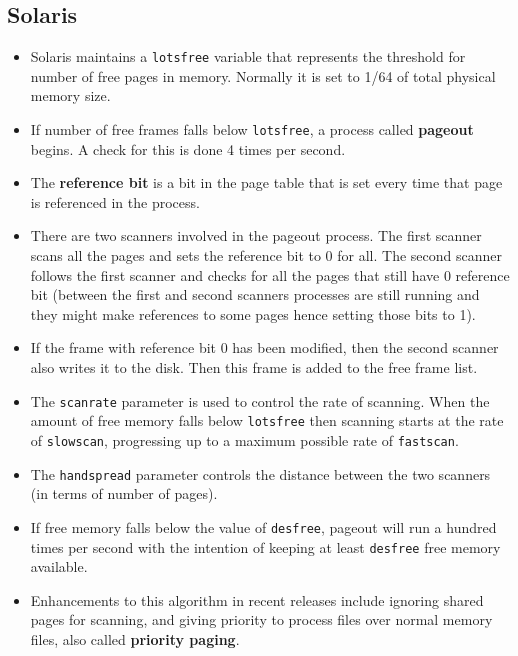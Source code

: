\documentclass{article}
\theoremstyle{plain}
\theoremstyle{definition}
\begin{document}
\subsection{Solaris}
\begin{itemize}
    \item Solaris maintains a \texttt{lotsfree} variable that represents the threshold for number of free pages in memory. Normally it is set to 1/64 of total physical memory size. 
    
    \item If number of free frames falls below \texttt{lotsfree}, a process called \textbf{pageout} begins. A check for this is done 4 times per second. 
    
    \item The \textbf{reference bit} is a bit in the page table that is set every time that page is referenced in the process. 
    
    \item There are two scanners involved in the pageout process. The first scanner scans all the pages and sets the reference bit to 0 for all. The second scanner follows the first scanner and checks for all the pages that still have 0 reference bit (between the first and second scanners processes are still running and they might make references to some pages hence setting those bits to 1). 
    
    \item If the frame with reference bit 0 has been modified, then the second scanner also writes it to the disk. Then this frame is added to the free frame list. 
    
    \item The \texttt{scanrate} parameter is used to control the rate of scanning. When the amount of free memory falls below \texttt{lotsfree} then scanning starts at the rate of \texttt{slowscan}, progressing up to a maximum possible rate of \texttt{fastscan}. 
    
    \item The \texttt{handspread} parameter controls the distance between the two scanners (in terms of number of pages). 
    
    \item If free memory falls below the value of \texttt{desfree}, pageout will run a hundred times per second with the intention of keeping at least \texttt{desfree} free memory available.
    
    \item Enhancements to this algorithm in recent releases include ignoring shared pages for scanning, and giving priority to process files over normal memory files, also called \textbf{priority paging}. 
\end{itemize}
\end{document}
